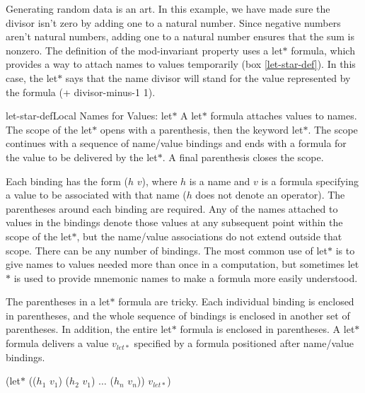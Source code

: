 Generating
random data
is an art.
In this example, we have made sure the divisor isn't zero
by adding one to a natural number.
Since negative numbers aren't natural numbers, adding one
to a natural number ensures that the sum is nonzero.
\label{let-example-brief-explain}
The definition of the \textsf{mod-invariant} property
uses a \textsf{let$*$} formula,
which provides a way to attach names to values temporarily
(box \ref{let-star-def}). %
In this case, the \textsf{let$*$} says that
the name \textsf{divisor} will stand for
the value represented by the formula \textsf{(+ divisor-minus-1 1)}.

\begin{aside}{let-star-def}{Local Names for Values: \textsf{let$*$}}
A
\textsf{let$*$}
formula attaches values to names.
The scope of the \textsf{let$*$} opens with a parenthesis,
then the keyword \textsf{let$*$}.
The scope continues with
a sequence of name/value bindings
and ends with a formula for the value
to be delivered by the \textsf{let$*$}.
A final parenthesis closes the scope.

Each binding has the form ($h$ $v$),
where $h$ is a name and $v$ is a
formula specifying a value to be associated with that name
($h$ does not denote an operator).
The parentheses around each binding are required.
Any of the names attached to values in the bindings
denote those values at any
subsequent point within the scope
of the \textsf{let$*$},
but the name/value associations do not
extend outside that scope.
There can be any number of bindings.
The most common use of \textsf{let$*$} is to give names
to values needed more than once in a computation,
but sometimes \textsf{let$*$} is used to provide mnemonic names
to make a formula more easily understood.

The parentheses in a \textsf{let$*$} formula are tricky.
Each individual binding is enclosed in parentheses,
and the whole sequence of bindings is enclosed in another set
of parentheses. In addition, the entire \textsf{let$*$} formula
is enclosed in parentheses.
A \textsf{let$*$} formula delivers a value $v_{let*}$
specified by a formula positioned after name/value bindings.
\begin{center}
(let$*$ (($h_1$ $v_1$) ($h_2$ $v_1$) $\dots$ ($h_n$ $v_n$)) $v_{let*}$)
\end{center}
\end{aside}

